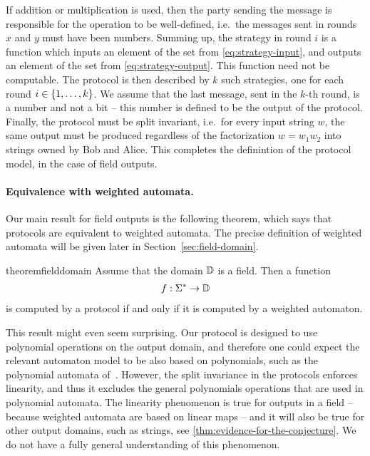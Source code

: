 If addition or multiplication is used, then the party sending the message is responsible for the operation to be well-defined, i.e.~the messages sent in rounds $x$ and $y$ must have been numbers.
Summing up, the strategy in round $i$ is a function which inputs an element of the set from \eqref{eq:strategy-input}, and outputs an element of the set from \eqref{eq:strategy-output}. This function need not be computable. The protocol is then described by $k$ such strategies, one for each round $i \in \{1,\ldots,k\}$. We assume that the last message, sent in the $k$-th round, is a number and not a bit -- this number is defined to be the output of the protocol. 
Finally, the protocol must be split invariant, i.e.~for every input string $w$, the same output must be produced regardless of the factorization $w = w_1 w_2$ into strings owned by Bob and Alice. This completes the definintion of the protocol model, in the case of field outputs.


\paragraph*{Equivalence with weighted automata.} Our main result for field outputs is the following theorem, which says that protocols are equivalent to weighted automata. The precise definition of weighted automata will be given later in Section~\ref{sec:field-domain}.



\begin{restatable}{theorem}{fielddomain}
    \label{thm:field-domain}
     Assume that the domain $\mathbb D$ is a field. Then a function 
    \begin{align*}
    f : \Sigma^* \to \mathbb D
    \end{align*}  is computed by a protocol if and only if it is  computed by a weighted automaton.
\end{restatable}



  This result might even seem surprising. Our protocol is designed to use polynomial operations on the output domain, and therefore one could expect the relevant automaton model to be also based on polynomials, such as the  polynomial automata of~\cite{DBLP:conf/lics/BenediktDSW17}. However,  the split invariance in the protocols  enforces linearity, and thus it excludes the general polynomials operations that are used in polynomial automata. The linearity phenomenon is true for outputs in a field -- because weighted automata are based on linear maps -- and it will also be true for other output domains, such as strings, see \cref{thm:evidence-for-the-conjecture}. We do not have a fully general understanding of this phenomenon.

